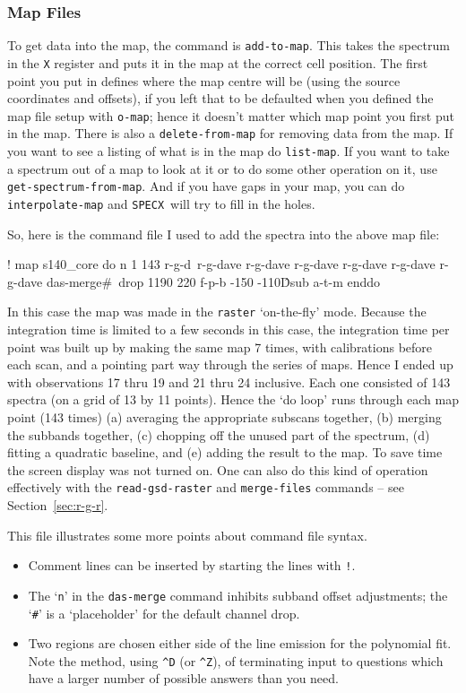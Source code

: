 \documentclass[11pt,twoside]{starlink}
\providecommand{\SPECX}{\texttt{SPECX}}
\begin{document}
\subsubsection{Map Files}
\label{sec:specx_13.2}
To get data into the map, the command is \texttt{add-to-map}.  This takes
the spectrum in the \texttt{X} register and puts it in the map at the
correct cell position.  The first point you put in defines where the
map centre will be (using the source coordinates and offsets), if you
left that to be defaulted when you defined the map file setup with
\texttt{o-map}; hence it doesn't matter which map point you first put in
the map. There is also a \texttt{delete-from-map}
for removing data from the map.  If you want to see a listing of what is
in the map do \texttt{list-map}. If you want to take a spectrum out of a
map to look at it or to do some other operation on it, use \texttt{get-spectrum-from-map}.  And if you have gaps in your map, you can do
\texttt{interpolate-map} and \SPECX\ will try to fill in the holes.

So, here is the command file I used to add the spectra into the above
map file:

\begin{terminalv}
! map s140_core
do n 1 143
r-g-d\n\
r-g-d\n\;ave
r-g-d\n\;ave
r-g-d\n\;ave
r-g-d\n\;ave
r-g-d\n\;ave
r-g-d\n\;ave
das-merge\#\n\
drop 1190 220
f-p-b -150 -110\^D\2\;sub
a-t-m
enddo
\end{terminalv}

In this case the map was made in the \texttt{raster} `on-the-fly'
mode. Because the integration time is limited to a few seconds in this
case, the integration time per point was built up by making the same
map 7 times, with calibrations before each scan, and a pointing part
way through the series of maps. Hence I ended up with observations 17
thru 19 and 21 thru 24 inclusive. Each one consisted of 143 spectra
(on a grid of 13 by 11 points). Hence the `do loop' runs through each
map point (143 times) (a) averaging the appropriate subscans together,
(b) merging the subbands together, (c) chopping off the unused part of
the spectrum, (d) fitting a quadratic baseline, and (e) adding the
result to the map. To save time the screen display was not turned
on. One can also do this kind of operation effectively with the \texttt{read-gsd-raster} and \texttt{merge-files} commands -- see
Section~\ref{sec:r-g-r}.

This file illustrates some more points about command file syntax.
\begin{itemize}
\item
Comment lines can be inserted by starting the lines with \texttt{!}.
\item
The `{\tt{n}}' in the \texttt{das-merge} command inhibits subband offset
adjustments; the `\verb|#|' is a `placeholder' for the default channel
drop.
\item
Two regions are chosen either side of the line emission for the
polynomial fit.  Note the method, using \verb|^D| (or \verb|^Z|), of
terminating
input to questions which have a larger number of possible answers
than you need.
\end{itemize}
\end{document}
